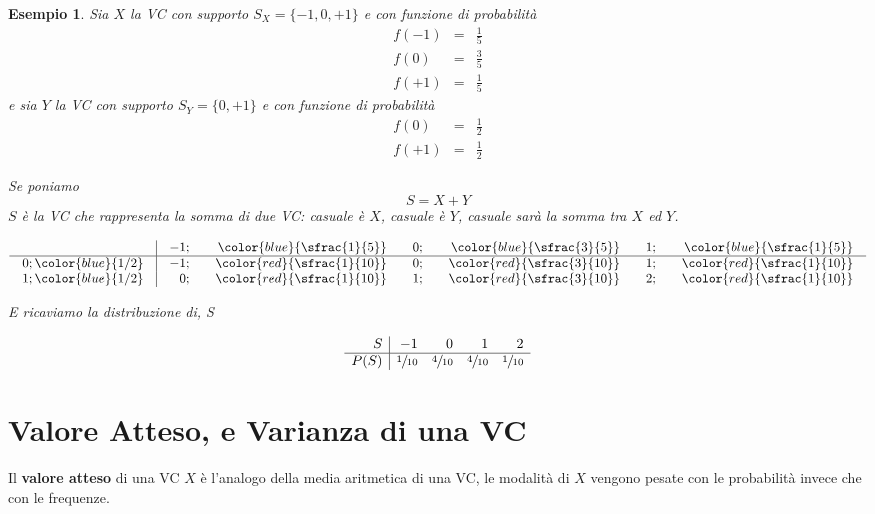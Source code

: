 \documentclass[
  11pt,
]{book}
\theoremstyle{mytheoremstyle}
\theoremstyle{mydefstyle}
\newtheorem{example}{{Esempio}}[section]
\begin{document}
\begin{example}
Sia \(X\) la VC con supporto \(S_X=\{-1,0,+1\}\) e con funzione di probabilità
\begin{eqnarray*}
   f(-1)&=&  \frac 15\\
   f(0)&=&\frac 35\\
   f(+1)&=&\frac 15
\end{eqnarray*}
e sia \(Y\) la VC con supporto \(S_Y=\{0,+1\}\) e con funzione di probabilità
\begin{eqnarray*}
   f(0)&=&\frac 12\\
   f(+1)&=&\frac 12
\end{eqnarray*}

Se poniamo
\[
S=X+Y
\]
\(S\) è la VC che rappresenta la somma di due VC: casuale è \(X\), casuale è \(Y\), casuale sarà la
somma tra \(X\) ed \(Y\).

\normalsize

\[\arraycolsep=10pt\def\arraystretch{1}\begin{array}{ r|rrrrrr }
& -1 ;&\color{blue}{ \sfrac{ 1 } { 5 }} & 0 ;&\color{blue}{ \sfrac{ 3 } { 5 }} & 1 ;&\color{blue}{ \sfrac{ 1 } { 5 }} \\ 
\hline 
0 ;\color{blue}{ 1 / 2 }& -1;&\color{red}{\sfrac{1}{10}}& 0;&\color{red}{\sfrac{3}{10}}& 1;&\color{red}{\sfrac{1}{10}}\\ 
1 ;\color{blue}{ 1 / 2 }& 0;&\color{red}{\sfrac{1}{10}}& 1;&\color{red}{\sfrac{3}{10}}& 2;&\color{red}{\sfrac{1}{10}}\\ 
\end{array}
 \]

\normalsize E ricaviamo la distribuzione di, S

\normalsize

\[
     \begin{array}{ r|rrrr }
 S  & -1& 0& 1& 2 \\ 
 \hline 
 P( S ) & \sfrac{1}{10}& \sfrac{4}{10}& \sfrac{4}{10}& \sfrac{1}{10} \\ 
 \end{array}
 \]
\end{example}

\section{Valore Atteso, e Varianza di una VC}\label{valore-atteso-e-varianza-di-una-vc}

Il \textbf{valore atteso} di una VC \(X\) è l'analogo della media aritmetica di una VC,
le modalità di \(X\) vengono pesate con le probabilità invece che con le frequenze.
\end{document}
